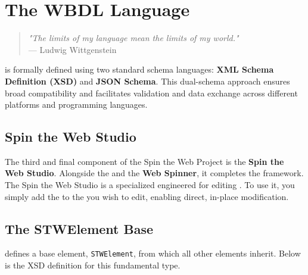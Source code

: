 
\chapter{The WBDL Language}
\label{chap:wbdl-language}

\begin{quote}
\textit{"The limits of my language mean the limits of my world."} \\
— Ludwig Wittgenstein
\end{quote}

\wbdl{} is formally defined using two standard schema languages: \textbf{XML Schema Definition (XSD)} and \textbf{JSON Schema}. This dual-schema approach ensures broad compatibility and facilitates validation and data exchange across different platforms and programming languages.

\section{Spin the Web Studio}
\label{sec:studio}

The third and final component of the Spin the Web Project is the \textbf{Spin the Web Studio}. Alongside the \textbf{\wbdl{}} and the \textbf{Web Spinner}, it completes the framework. The Spin the Web Studio is a specialized \webbaselet{} engineered for editing . To use it, you simply add the \webbaselet{} to the \webbase{} you wish to edit, enabling direct, in-place modification.

\section{The STWElement Base}
\label{sec:stwelement-base}

\wbdl{} defines a base element, \texttt{STWElement}, from which all other elements inherit. Below is the XSD definition for this fundamental type.

